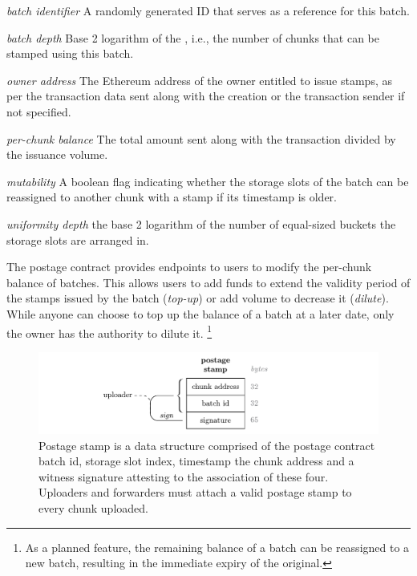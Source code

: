 \begin{labelledlist}
\item[\emph{batch identifier}] A randomly generated ID that serves as a reference for this batch.
\item[\emph{batch depth}] Base 2 logarithm of the , i.e., the number of chunks that can be stamped using this batch. 
\item[\emph{owner address}] The Ethereum address of the owner entitled to issue stamps, as per the transaction data sent along with the creation or the  transaction sender if not specified.
\item[\emph{per-chunk balance}] The total amount sent along with the transaction divided by the issuance volume.
\item[\emph{mutability}] A boolean flag indicating whether the storage slots of the batch can be reassigned to another chunk with a stamp if its timestamp is older. 
\item[\emph{uniformity depth}] the base 2 logarithm of the number of equal-sized buckets the storage slots are arranged in.
\end{labelledlist}

The postage contract provides endpoints to users to modify the per-chunk balance of batches. This allows users to add funds to extend the validity period of the stamps issued by the batch (\/\emph{top-up}) or add volume to decrease it (\/\emph{dilute}).
While anyone can choose to top up the balance of a batch at a later date, only the owner has the authority to dilute it.%
%
\footnote{As a planned feature, the remaining balance of a batch can be reassigned to a new batch, resulting in the immediate expiry of the original.}



\begin{figure}[!ht]
  \centering
    \includegraphics[width=\textwidth]{fig/postage-stamp-structure.pdf}
  \caption[Postage stamp]{Postage stamp is a data structure comprised of the postage contract batch id, storage slot index, timestamp the chunk address and a witness signature attesting to the association of these four. Uploaders and forwarders must attach a valid postage stamp to every chunk uploaded. }
  \label{fig:postage-stamp}
\end{figure}

